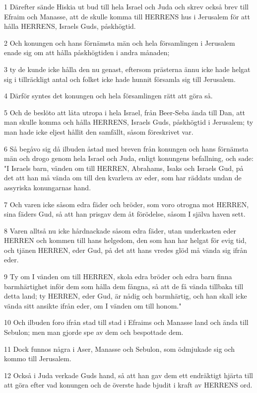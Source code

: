 \par 1 Därefter sände Hiskia ut bud till hela Israel och Juda och skrev också brev till Efraim och Manasse, att de skulle komma till HERRENS hus i Jerusalem för att hålla HERRENS, Israels Guds, påskhögtid.
\par 2 Och konungen och hans förnämsta män och hela församlingen i Jerusalem enade sig om att hålla påskhögtiden i andra månaden;
\par 3 ty de kunde icke hålla den nu genast, eftersom prästerna ännu icke hade helgat sig i tillräckligt antal och folket icke hade hunnit församla sig till Jerusalem.
\par 4 Därför syntes det konungen och hela församlingen rätt att göra så.
\par 5 Och de beslöto att låta utropa i hela Israel, från Beer-Seba ända till Dan, att man skulle komma och hålla HERRENS, Israels Guds, påskhögtid i Jerusalem; ty man hade icke eljest hållit den samfällt, såsom föreskrivet var.
\par 6 Så begåvo sig då ilbuden åstad med breven från konungen och hans förnämsta män och drogo genom hela Israel och Juda, enligt konungens befallning, och sade: "I Israels barn, vänden om till HERREN, Abrahams, Isaks och Israels Gud, på det att han må vända om till den kvarleva av eder, som har räddats undan de assyriska konungarnas hand.
\par 7 Och varen icke såsom edra fäder och bröder, som voro otrogna mot HERREN, sina fäders Gud, så att han prisgav dem åt förödelse, såsom I själva haven sett.
\par 8 Varen alltså nu icke hårdnackade såsom edra fäder, utan underkasten eder HERREN och kommen till hans helgedom, den som han har helgat för evig tid, och tjänen HERREN, eder Gud, på det att hans vredes glöd må vända sig ifrån eder.
\par 9 Ty om I vänden om till HERREN, skola edra bröder och edra barn finna barmhärtighet inför dem som hålla dem fångna, så att de få vända tillbaka till detta land; ty HERREN, eder Gud, är nådig och barmhärtig, och han skall icke vända sitt ansikte ifrån eder, om I vänden om till honom."
\par 10 Och ilbuden foro ifrån stad till stad i Efraims och Manasse land och ända till Sebulon; men man gjorde spe av dem och bespottade dem.
\par 11 Dock funnos några i Aser, Manasse och Sebulon, som ödmjukade sig och kommo till Jerusalem.
\par 12 Också i Juda verkade Guds hand, så att han gav dem ett endräktigt hjärta till att göra efter vad konungen och de överste hade bjudit i kraft av HERRENS ord.
